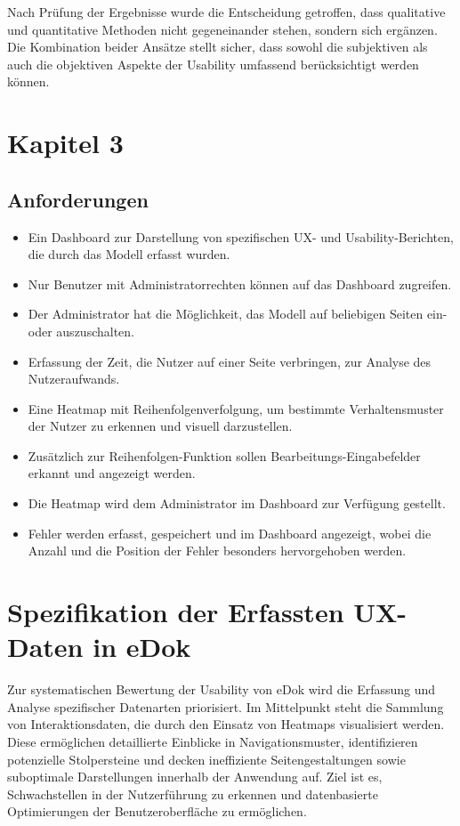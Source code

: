 \documentclass[12pt,oneside]{article}
\begin{document}
Nach Prüfung der Ergebnisse wurde die Entscheidung getroffen, dass qualitative und quantitative Methoden nicht gegeneinander stehen, sondern sich ergänzen. Die Kombination beider Ansätze stellt sicher, dass sowohl die subjektiven als auch die objektiven Aspekte der Usability umfassend berücksichtigt werden können.


\section{Kapitel 3}
\subsection{Anforderungen}
\begin{itemize}
\item Ein Dashboard zur Darstellung von spezifischen UX- und Usability-Berichten, die durch das Modell erfasst wurden.
\item Nur Benutzer mit Administratorrechten können auf das Dashboard zugreifen.
\item Der Administrator hat die Möglichkeit, das Modell auf beliebigen Seiten ein- oder auszuschalten.
\item Erfassung der Zeit, die Nutzer auf einer Seite verbringen, zur Analyse des Nutzeraufwands.
\item Eine Heatmap mit Reihenfolgenverfolgung, um bestimmte Verhaltensmuster der Nutzer zu erkennen und visuell   darzustellen.
\item Zusätzlich zur Reihenfolgen-Funktion sollen Bearbeitungs-Eingabefelder erkannt und angezeigt werden.
\item Die Heatmap wird dem Administrator im Dashboard zur Verfügung gestellt.
\item Fehler werden erfasst, gespeichert und im Dashboard angezeigt, wobei die Anzahl und die Position der Fehler besonders hervorgehoben werden.

\end{itemize}
\section{Spezifikation der Erfassten UX-Daten in eDok}

Zur systematischen Bewertung der Usability von eDok wird die Erfassung und Analyse spezifischer Datenarten priorisiert. Im Mittelpunkt steht die Sammlung von Interaktionsdaten, die durch den Einsatz von Heatmaps visualisiert werden. Diese ermöglichen detaillierte Einblicke in Navigationsmuster, identifizieren potenzielle Stolpersteine und decken ineffiziente Seitengestaltungen sowie suboptimale Darstellungen innerhalb der Anwendung auf. Ziel ist es, Schwachstellen in der Nutzerführung zu erkennen und datenbasierte Optimierungen der Benutzeroberfläche zu ermöglichen.
\end{document}
